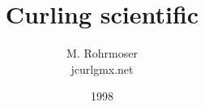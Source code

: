 \documentclass[a4paper,11pt,twoside]{report}
\title{Curling scientific}
\author{M. Rohrmoser\\{\small jcurl\symbol{64}gmx.net}}
\begin{document}
\date{1998}
\maketitle
\tableofcontents
\listoffigures


\begin{appendix}
\end{appendix}


 \nocite{brach:92}
 \nocite{feynmanI:89}
 \nocite{gammert}
 \nocite{greinerII:85}
 \nocite{gross:95}
 \nocite{hertz:81}
 \nocite{hills:93}
 \nocite{hughesI:76}
 \nocite{hughesII:76}
 \nocite{lehmann:85}
 \nocite{meybergI:93}
 \nocite{van:89}
 \nocite{sutor:88}
 \nocite{denny:98}
 \nocite{shegelski:96}
 \nocite{voyenli:85}
 \nocite{voyenli:86}
 \nocite{daniels:86}
 \nocite{johnston:81}
\end{document}

